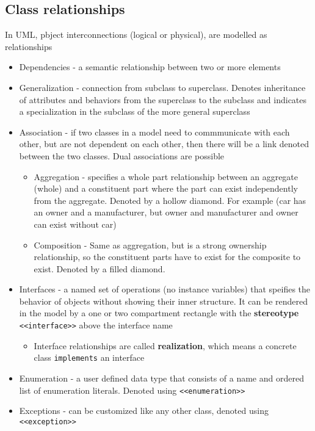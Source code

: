 \documentclass[12pt]{book}
\begin{document}
\subsection*{Class relationships}

In UML, pbject interconnections (logical or physical), are modelled as relationships

\begin{itemize}
    \item Dependencies - a semantic relationship between two or more elements
    
    \item Generalization - connection from subclass to superclass. Denotes inheritance of attributes and behaviors from the superclass to the subclass and indicates a specialization in the subclass of the more general superclass
    
    \item Association - if two classes in a model need to commmunicate with each other, but are not dependent on each other, then there will be a link denoted between the two classes. Dual associations are possible
    \begin{itemize}
        \item Aggregation - specifies a whole part relationship between an aggregate (whole) and a constituent part where the part can exist independently from the aggregate. Denoted by a hollow diamond. For example (car has an owner and a manufacturer, but owner and manufacturer and owner can exist without car)
        \item Composition - Same as aggregation, but is a strong ownership relationship, so the constituent parts have to exist for the composite to exist. Denoted by a filled diamond.
    \end{itemize} 

    \item Interfaces - a named set of operations (no instance variables) that speifies the behavior of objects without showing their inner structure. It can be rendered in the model by a one or two compartment rectangle with the \textbf{stereotype} \texttt{<<interface>>} above the interface name
    \begin{itemize}
        \item Interface relationships are called \textbf{realization}, which means a concrete class \texttt{implements} an interface
    \end{itemize} 

    \item Enumeration - a user defined data type that consists of a name and ordered list of enumeration literals. Denoted using \texttt{<<enumeration>>}
    
    \item Exceptions - can be customized like any other class, denoted using \texttt{<<exception>>}
\end{itemize}
\end{document}

